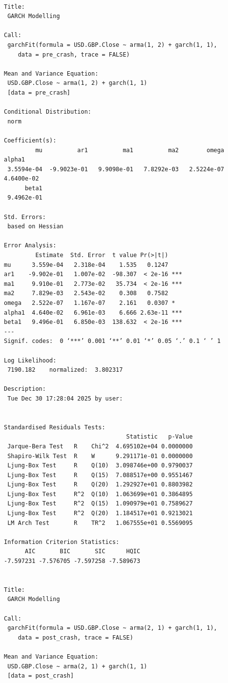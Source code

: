 \documentclass[a4paper]{article}
\begin{document}
\label{orgce48fe1}
\begin{verbatim}

Title:
 GARCH Modelling 

Call:
 garchFit(formula = USD.GBP.Close ~ arma(1, 2) + garch(1, 1), 
    data = pre_crash, trace = FALSE) 

Mean and Variance Equation:
 USD.GBP.Close ~ arma(1, 2) + garch(1, 1)
 [data = pre_crash]

Conditional Distribution:
 norm 

Coefficient(s):
         mu          ar1          ma1          ma2        omega       alpha1  
 3.5594e-04  -9.9023e-01   9.9098e-01   7.8292e-03   2.5224e-07   4.6400e-02  
      beta1  
 9.4962e-01  

Std. Errors:
 based on Hessian 

Error Analysis:
         Estimate  Std. Error  t value Pr(>|t|)    
mu      3.559e-04   2.318e-04    1.535   0.1247    
ar1    -9.902e-01   1.007e-02  -98.307  < 2e-16 ***
ma1     9.910e-01   2.773e-02   35.734  < 2e-16 ***
ma2     7.829e-03   2.543e-02    0.308   0.7582    
omega   2.522e-07   1.167e-07    2.161   0.0307 *  
alpha1  4.640e-02   6.961e-03    6.666 2.63e-11 ***
beta1   9.496e-01   6.850e-03  138.632  < 2e-16 ***
---
Signif. codes:  0 ‘***’ 0.001 ‘**’ 0.01 ‘*’ 0.05 ‘.’ 0.1 ‘ ’ 1

Log Likelihood:
 7190.182    normalized:  3.802317 

Description:
 Tue Dec 30 17:28:04 2025 by user:  


Standardised Residuals Tests:
                                   Statistic   p-Value
 Jarque-Bera Test   R    Chi^2  4.695102e+04 0.0000000
 Shapiro-Wilk Test  R    W      9.291171e-01 0.0000000
 Ljung-Box Test     R    Q(10)  3.098746e+00 0.9790037
 Ljung-Box Test     R    Q(15)  7.088517e+00 0.9551467
 Ljung-Box Test     R    Q(20)  1.292927e+01 0.8803982
 Ljung-Box Test     R^2  Q(10)  1.063699e+01 0.3864895
 Ljung-Box Test     R^2  Q(15)  1.090979e+01 0.7589627
 Ljung-Box Test     R^2  Q(20)  1.184517e+01 0.9213021
 LM Arch Test       R    TR^2   1.067555e+01 0.5569095

Information Criterion Statistics:
      AIC       BIC       SIC      HQIC 
-7.597231 -7.576705 -7.597258 -7.589673 


Title:
 GARCH Modelling 

Call:
 garchFit(formula = USD.GBP.Close ~ arma(2, 1) + garch(1, 1), 
    data = post_crash, trace = FALSE) 

Mean and Variance Equation:
 USD.GBP.Close ~ arma(2, 1) + garch(1, 1)
 [data = post_crash]


\end{verbatim}
\end{document}
